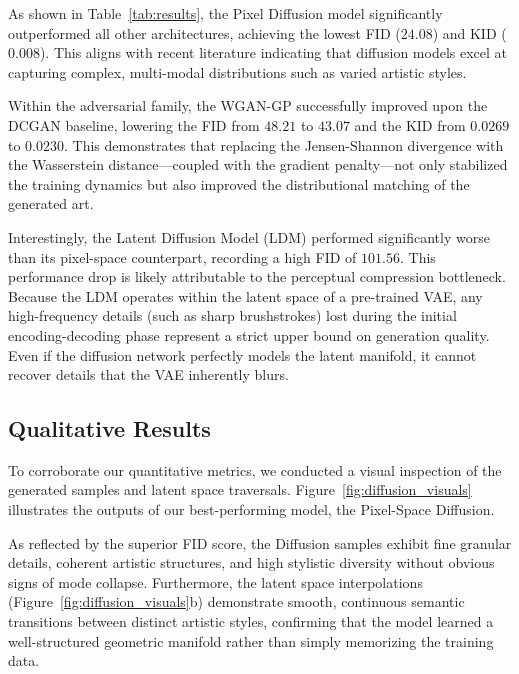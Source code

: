 \documentclass[runningheads]{llncs}
\begin{document}
As shown in Table~\ref{tab:results}, the Pixel Diffusion model significantly outperformed all other architectures, achieving the lowest FID ($24.08$) and KID ($0.008$). This aligns with recent literature indicating that diffusion models excel at capturing complex, multi-modal distributions such as varied artistic styles.

Within the adversarial family, the WGAN-GP successfully improved upon the DCGAN baseline, lowering the FID from $48.21$ to $43.07$ and the KID from $0.0269$ to $0.0230$. This demonstrates that replacing the Jensen-Shannon divergence with the Wasserstein distance—coupled with the gradient penalty—not only stabilized the training dynamics but also improved the distributional matching of the generated art.

Interestingly, the Latent Diffusion Model (LDM) performed significantly worse than its pixel-space counterpart, recording a high FID of $101.56$. This performance drop is likely attributable to the perceptual compression bottleneck. Because the LDM operates within the latent space of a pre-trained VAE, any high-frequency details (such as sharp brushstrokes) lost during the initial encoding-decoding phase represent a strict upper bound on generation quality. Even if the diffusion network perfectly models the latent manifold, it cannot recover details that the VAE inherently blurs.

\subsection{Qualitative Results}
To corroborate our quantitative metrics, we conducted a visual inspection of the generated samples and latent space traversals. Figure~\ref{fig:diffusion_visuals} illustrates the outputs of our best-performing model, the Pixel-Space Diffusion.

As reflected by the superior FID score, the Diffusion samples exhibit fine granular details, coherent artistic structures, and high stylistic diversity without obvious signs of mode collapse. Furthermore, the latent space interpolations (Figure~\ref{fig:diffusion_visuals}b) demonstrate smooth, continuous semantic transitions between distinct artistic styles, confirming that the model learned a well-structured geometric manifold rather than simply memorizing the training data.

\end{document}
